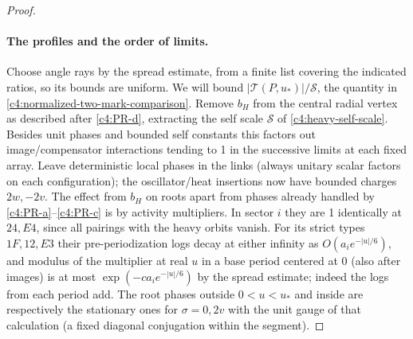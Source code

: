 \begin{proof}
\leavevmode\par

\paragraph{The profiles and the order of limits.}
Choose angle rays by the spread estimate, from a finite list covering the indicated ratios, so its bounds are uniform. We will bound \(|\mathcal T(P,u_*)|/\mathcal S\), the quantity in \eqref{c4:normalized-two-mark-comparison}. Remove \(b_H\) from the central radial vertex as described after \eqref{c4:PR-d}, extracting the self scale \(\mathcal S\) of \eqref{c4:heavy-self-scale}. Besides unit phases and bounded self constants this factors out image/compensator interactions tending to 1 in the successive limits at each fixed array. Leave deterministic local phases in the links (always unitary scalar factors on each configuration); the oscillator/heat insertions now have bounded charges \(2w,-2v\). The effect from \(b_H\) on roots apart from phases already handled by \eqref{c4:PR-a}--\eqref{c4:PR-c} is by activity multipliers. In sector \(i\) they are 1 identically at \(24,E4\), since all pairings with the heavy orbits vanish. For its strict types \(1F,12,E3\) their pre-periodization logs decay at either infinity as \(O(a_i e^{-|u|/6})\), and modulus of the multiplier at real \(u\) in a base period centered at 0 (also after images) is at most \(\exp(-c a_i e^{-|u|/6})\) by the spread estimate; indeed the logs from each period add. The root phases outside \(0<u<u_*\) and inside are respectively the stationary ones for \(\sigma=0,2v\) with the unit gauge of that calculation (a fixed diagonal conjugation within the segment).


\end{proof}
